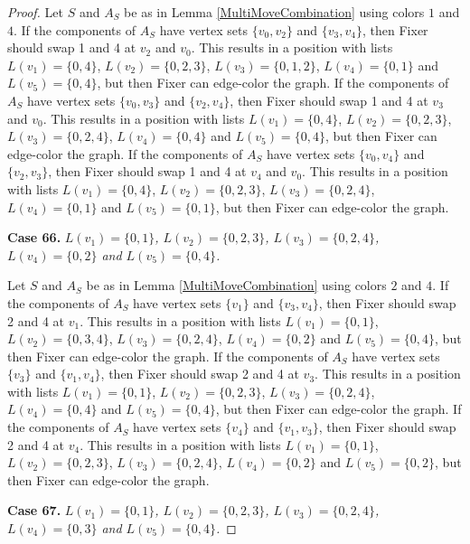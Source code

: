 \documentclass[12pt]{amsart}
\theoremstyle{plain}
\theoremstyle{definition}
\theoremstyle{remark}
\begin{document}
\begin{proof}
Let $S$ and $A_S$ be as in Lemma \ref{MultiMoveCombination} using colors $1$ and $4$. If the components of $A_S$ have vertex sets $\{v_0, v_2\}$ and $\{v_3, v_4\}$, then Fixer should swap 1 and 4 at $v_2$ and $v_0$. This results in a position with lists $L(v_1) = \{0, 4\}$, $L(v_2) = \{0, 2, 3\}$, $L(v_3) = \{0, 1, 2\}$, $L(v_4) = \{0, 1\}$ and $L(v_5) = \{0, 4\}$, but then Fixer can edge-color the graph.
If the components of $A_S$ have vertex sets $\{v_0, v_3\}$ and $\{v_2, v_4\}$, then Fixer should swap 1 and 4 at $v_3$ and $v_0$. This results in a position with lists $L(v_1) = \{0, 4\}$, $L(v_2) = \{0, 2, 3\}$, $L(v_3) = \{0, 2, 4\}$, $L(v_4) = \{0, 4\}$ and $L(v_5) = \{0, 4\}$, but then Fixer can edge-color the graph.
If the components of $A_S$ have vertex sets $\{v_0, v_4\}$ and $\{v_2, v_3\}$, then Fixer should swap 1 and 4 at $v_4$ and $v_0$. This results in a position with lists $L(v_1) = \{0, 4\}$, $L(v_2) = \{0, 2, 3\}$, $L(v_3) = \{0, 2, 4\}$, $L(v_4) = \{0, 1\}$ and $L(v_5) = \{0, 1\}$, but then Fixer can edge-color the graph.

\noindent\textbf{Case 66.  }\textit{$L(v_1) = \{0, 1\}$, $L(v_2) = \{0, 2, 3\}$, $L(v_3) = \{0, 2, 4\}$, $L(v_4) = \{0, 2\}$ and $L(v_5) = \{0, 4\}$.}

Let $S$ and $A_S$ be as in Lemma \ref{MultiMoveCombination} using colors $2$ and $4$. If the components of $A_S$ have vertex sets $\{v_1\}$ and $\{v_3, v_4\}$, then Fixer should swap 2 and 4 at $v_1$. This results in a position with lists $L(v_1) = \{0, 1\}$, $L(v_2) = \{0, 3, 4\}$, $L(v_3) = \{0, 2, 4\}$, $L(v_4) = \{0, 2\}$ and $L(v_5) = \{0, 4\}$, but then Fixer can edge-color the graph.
If the components of $A_S$ have vertex sets $\{v_3\}$ and $\{v_1, v_4\}$, then Fixer should swap 2 and 4 at $v_3$. This results in a position with lists $L(v_1) = \{0, 1\}$, $L(v_2) = \{0, 2, 3\}$, $L(v_3) = \{0, 2, 4\}$, $L(v_4) = \{0, 4\}$ and $L(v_5) = \{0, 4\}$, but then Fixer can edge-color the graph.
If the components of $A_S$ have vertex sets $\{v_4\}$ and $\{v_1, v_3\}$, then Fixer should swap 2 and 4 at $v_4$. This results in a position with lists $L(v_1) = \{0, 1\}$, $L(v_2) = \{0, 2, 3\}$, $L(v_3) = \{0, 2, 4\}$, $L(v_4) = \{0, 2\}$ and $L(v_5) = \{0, 2\}$, but then Fixer can edge-color the graph.

\noindent\textbf{Case 67.  }\textit{$L(v_1) = \{0, 1\}$, $L(v_2) = \{0, 2, 3\}$, $L(v_3) = \{0, 2, 4\}$, $L(v_4) = \{0, 3\}$ and $L(v_5) = \{0, 4\}$.}


\end{proof}
\end{document}
